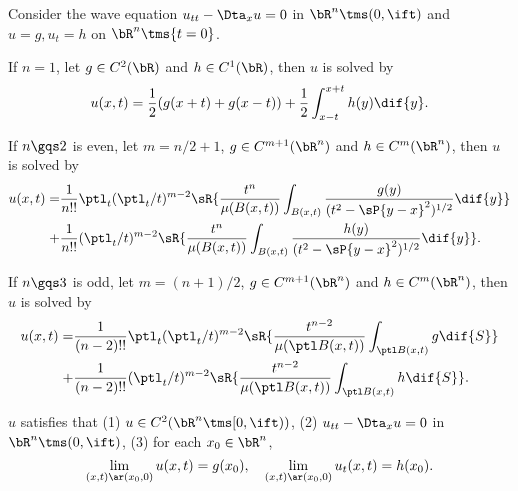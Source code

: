 \documentclass[article, a4paper, twoside]{universal}
\begin{document}
\begin{thm}
    Consider the wave equation $u_{tt}-\Dta_{x}u =0$ in $\bR^{n}\tms(0,\ift)$ and $u=g, u_{t}=h$ on $\bR^{n}\tms\{t=0\}$.
    \begin{itm}
    \item If $n=1$, let $g\in C^{2}(\bR)$ and $h\in C^{1}(\bR)$, then $u$ is solved by
    \[
        u(x,t)=\frac{1}{2}(g(x+t)+g(x-t))+\frac{1}{2}\int_{x-t}^{x+t}h(y)\dif{y}.
    \]
    \item If $n\gqs2$ is even, let $m=n/2+1$, $g\in C^{m+1}(\bR^{n})$ and $h\in C^{m}(\bR^{n})$, then $u$ is solved by
    \begin{align*}
      u(x,t)=&\frac{1}{n!!}\ptl_{t}(\ptl_{t}/t)^{m-2}\sR{\frac{t^{n}}{\mu(B(x,t))}\int_{B(x,t)}\frac{g(y)}{(t^{2}-\sP{y-x}^{2})^{1/2}}\dif{y}}\\
      +&\frac{1}{n!!}(\ptl_{t}/t)^{m-2}\sR{\frac{t^{n}}{\mu(B(x,t))}\int_{B(x,t)}\frac{h(y)}{(t^{2}-\sP{y-x}^{2})^{1/2}}\dif{y}}.
    \end{align*}

    \item If $n\gqs3$ is odd, let $m=(n+1)/2$, $g\in C^{m+1}(\bR^{n})$ and $h\in C^{m}(\bR^{n})$, then $u$ is solved by
    \begin{align*}
      u(x,t)=&\frac{1}{(n-2)!!}\ptl_{t}(\ptl_{t}/t)^{m-2}\sR{\frac{t^{n-2}}{\mu(\ptl B(x,t))}\int_{\ptl B(x,t)}g\dif{S}}\\
      +&\frac{1}{(n-2)!!}(\ptl_{t}/t)^{m-2}\sR{\frac{t^{n-2}}{\mu(\ptl B(x,t))}\int_{\ptl B(x,t)}h\dif{S}}.
    \end{align*}
    \end{itm}

    $u$ satisfies that (1) $u\in C^{2}(\bR^{n}\tms[0,\ift))$, (2) $u_{tt}-\Dta_{x}u=0$ in $\bR^{n}\tms(0,\ift)$, (3) for each $x_{0}\in\bR^{n}$,
    \[
        \lim_{(x,t)\ar(x_{0},0)}u(x,t)=g(x_{0}),\quad \lim_{(x,t)\ar(x_{0},0)}u_{t}(x,t)=h(x_{0}).
    \]
\end{thm}

\printref
\end{document}
